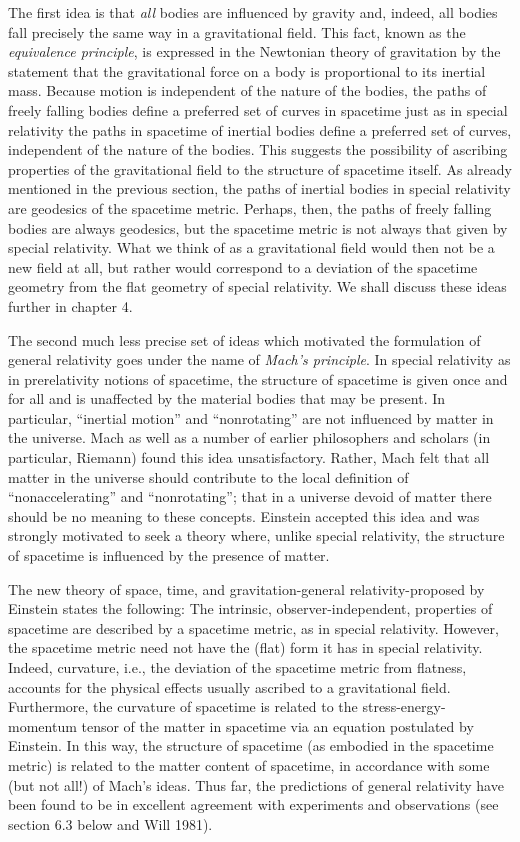 The first idea is that \emph{all} bodies are influenced by gravity and, indeed, all bodies fall precisely the same way in a gravitational field. This fact, known as the \emph{equivalence principle}, is expressed in the Newtonian theory of gravitation by the statement that the gravitational force on a body is proportional to its inertial mass. Because motion is independent of the nature of the bodies, the paths of freely falling bodies define a preferred set of curves in spacetime just as in special relativity the paths in spacetime of inertial bodies define a preferred set of curves, independent of the nature of the bodies. This suggests the possibility of ascribing properties of the gravitational field to the structure of spacetime itself. As already mentioned in the previous section, the paths of inertial bodies in special relativity are geodesics of the spacetime metric. Perhaps, then, the paths of freely falling bodies are always geodesics, but the spacetime metric is not always that given by special relativity. What we think of as a gravitational field would then not be a new field at all, but rather would correspond to a deviation of the spacetime geometry from the flat geometry of special relativity. We shall discuss these ideas further in chapter 4.

The second much less precise set of ideas which motivated the formulation of general relativity goes under the name of \emph{Mach's principle}. In special relativity as in prerelativity notions of spacetime, the structure of spacetime is given once and for all and is unaffected by the material bodies that may be present. In particular, ``inertial motion'' and ``nonrotating'' are not influenced by matter in the universe. Mach as well as a number of earlier philosophers and scholars (in particular, Riemann) found this idea unsatisfactory. Rather, Mach felt that all matter in the universe should contribute to the local definition of ``nonaccelerating'' and ``nonrotating''; that in a universe devoid of matter there should be no meaning to these concepts. Einstein accepted this idea and was strongly motivated to seek a theory where, unlike special relativity, the structure of spacetime is influenced by the presence of matter.

The new theory of space, time, and gravitation-general relativity-proposed by Einstein states the following: The intrinsic, observer-independent, properties of spacetime are described by a spacetime metric, as in special relativity. However, the spacetime metric need not have the (flat) form it has in special relativity. Indeed, curvature, i.e., the deviation of the spacetime metric from flatness, accounts for the physical effects usually ascribed to a gravitational field. Furthermore, the curvature of spacetime is related to the stress-energy-momentum tensor of the matter in spacetime via an equation postulated by Einstein. In this way, the structure of spacetime (as embodied in the spacetime metric) is related to the matter content of spacetime, in accordance with some (but not all!) of Mach's ideas. Thus far, the predictions of general relativity have been found to be in excellent agreement with experiments and observations (see section 6.3 below and Will 1981).


